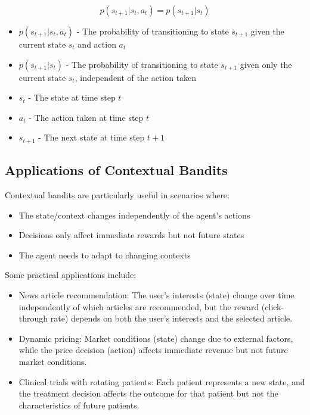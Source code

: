 \documentclass[12pt,a4paper]{article}
\begin{document}
\begin{equation}
p(s_{t+1}|s_t, a_t) = p(s_{t+1}|s_t)
\end{equation}

\begin{tcolorbox}[title=Notation Overview]
\begin{itemize}
    \item $p(s_{t+1}|s_t, a_t)$ - The probability of transitioning to state $s_{t+1}$ given the current state $s_t$ and action $a_t$
    \item $p(s_{t+1}|s_t)$ - The probability of transitioning to state $s_{t+1}$ given only the current state $s_t$, independent of the action taken
    \item $s_t$ - The state at time step $t$
    \item $a_t$ - The action taken at time step $t$
    \item $s_{t+1}$ - The next state at time step $t+1$
\end{itemize}
\end{tcolorbox}

\subsection{Applications of Contextual Bandits}

Contextual bandits are particularly useful in scenarios where:

\begin{itemize}
    \item The state/context changes independently of the agent's actions
    \item Decisions only affect immediate rewards but not future states
    \item The agent needs to adapt to changing contexts
\end{itemize}

Some practical applications include:

\begin{itemize}
    \item News article recommendation: The user's interests (state) change over time independently of which articles are recommended, but the reward (click-through rate) depends on both the user's interests and the selected article.
    
    \item Dynamic pricing: Market conditions (state) change due to external factors, while the price decision (action) affects immediate revenue but not future market conditions.
    
    \item Clinical trials with rotating patients: Each patient represents a new state, and the treatment decision affects the outcome for that patient but not the characteristics of future patients.
\end{itemize}
\end{document}
